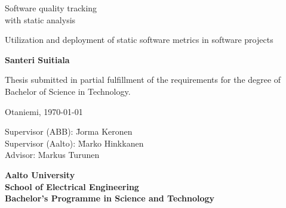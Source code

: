 {\parindent0pt %
\begin{spacing}{1.1}

 {\sffamily{}}
\end{spacing}

\vspace{12.7mm}

\begin{spacing}{1.63}
{\fontsize{17.8pt}{17.8pt}\selectfont Software quality tracking\\with static analysis}
\end{spacing}

\vspace{10.5mm}

\begin{spacing}{1.2}
{\fontsize{13pt}{13pt}\selectfont Utilization and deployment of static software metrics in software projects}
\end{spacing}

\vspace{10.6mm}

{\fontsize{13.9pt}{13.9pt}\bfseries\sffamily\lsstyle Santeri Suitiala}

\vfill

{\fontsize{10.3pt}{10.3pt}\sffamily\lsstyle\raggedright
\begin{spacing}{1.06}

Thesis submitted in partial fulfillment of the requirements for the
degree of Bachelor of Science in Technology.

Otaniemi, \today

\begin{tabbing}
Supervisor (ABB):\hspace{6mm} \= Jorma Keronen \\
Supervisor (Aalto):\hspace{6mm} \= Marko Hinkkanen \\
Advisor: \> Markus Turunen
\end{tabbing}
\vspace{-4mm}
\end{spacing}
} %

\vspace{11.5mm}

\begin{spacing}{.9}
{\bfseries\sffamily\lsstyle Aalto University \\
School of Electrical Engineering \\
Bachelor’s Programme in Science and Technology}
\end{spacing}
} %




